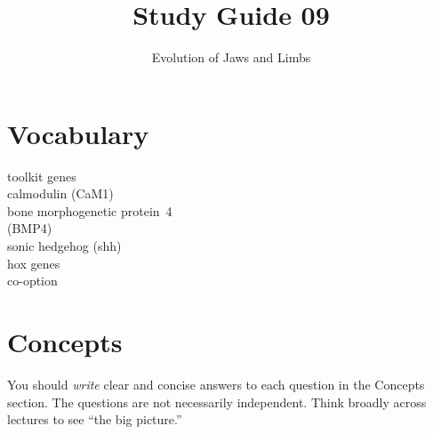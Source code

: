 \documentclass[letterpaper]{tufte-handout}
\title{Study Guide 09\hfill}
\author{Evolution of Jaws and Limbs}
\date{} %
\begin{document}
\maketitle	%


\section{Vocabulary}
\vspace{-1\baselineskip}
\begin{multicols}{2}
toolkit genes\\
calmodulin (CaM1)\\
bone morphogenetic protein\ 4\\\hspace{1em}(BMP4)\\
sonic hedgehog (shh)\\
hox genes\\
co-option
\end{multicols}

\section{Concepts}

You should \emph{write} clear and concise answers to each question in the Concepts section.  The questions are not necessarily independent.  Think broadly across lectures to see ``the big picture.'' 
\end{document}
